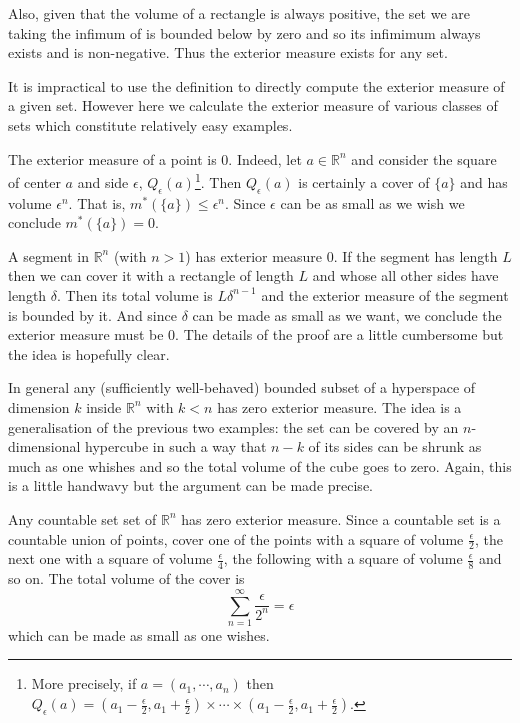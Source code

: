 \documentclass[12pt,oneside]{book}
\numberwithin{table}{section}
\numberwithin{equation}{section}
\numberwithin{figure}{section}
\newcommand{\R}{\mathbb{R}}
\newcommand{\ext}[1]{m^* \! \left( #1 \right)}
\begin{document}
Also, given that the volume of a rectangle is always positive, the set we are taking the infimum of is bounded below by zero and so its infimimum always exists and is non-negative. Thus the exterior measure exists for any set. 

\begin{example}
	It is impractical to use the definition to directly compute the exterior measure of a given set. However here we calculate the exterior measure of various classes of sets which constitute relatively easy examples.
	\begin{points}
	\item The exterior measure of a point is 0. Indeed, let \( a \in \R^n \) and consider the square of center \( a \) and side \( \epsilon \), \( Q_\epsilon(a) \)\footnote{More precisely, if \( a = (a_1, \cdots, a_n) \) then \( Q_\epsilon(a) = (a_1 - \frac{\epsilon}{2}, a_1 + \frac{\epsilon}{2}) \times \cdots \times (a_1 - \frac{\epsilon}{2}, a_1 + \frac{\epsilon}{2}) \).}. Then \( Q_\epsilon(a) \) is certainly a cover of \( \{ a\} \) and has volume \( \epsilon^n \). That is, \( \ext{\{ a \}} \leq \epsilon^n \). Since \( \epsilon \) can be as small as we wish we conclude \( \ext{\{ a \}} = 0 \).

	\item A segment in \( \R^n \) (with \( n > 1 \)) has exterior measure 0. If the segment has length \( L \) then we can cover it with a rectangle of length \( L \) and whose all other sides have length \( \delta \). Then its total volume is \( L\delta^{n-1} \) and the exterior measure of the segment is bounded by it. And since \( \delta \) can be made as small as we want, we conclude the exterior measure must be 0. The details of the proof are a little cumbersome but the idea is hopefully clear.

	\item In general any (sufficiently well-behaved) bounded subset of a hyperspace of dimension \( k \) inside \( \R^n \) with \( k < n \) has zero exterior measure. The idea is a generalisation of the previous two examples: the set can be covered by an \( n \)-dimensional hypercube in such a way that \( n - k \) of its sides can be shrunk as much as one whishes and so the total volume of the cube goes to zero. Again, this is a little handwavy but the argument can be made precise. 

	\item Any countable set set of \( \R^n \) has zero exterior measure. Since a countable set is a countable union of points, cover one of the points with a square of volume \( \frac{\epsilon}{2} \), the next one with a square of volume \( \frac{\epsilon}{4} \), the following with a square of volume \( \frac{\epsilon}{8} \) and so on. The total volume of the cover is
		\begin{equation*}
			\sum_{n = 1}^{\infty} \frac{\epsilon}{2^n} = \epsilon 
		\end{equation*}
		which can be made as small as one wishes.
	\end{points}
\end{example}
\end{document}
